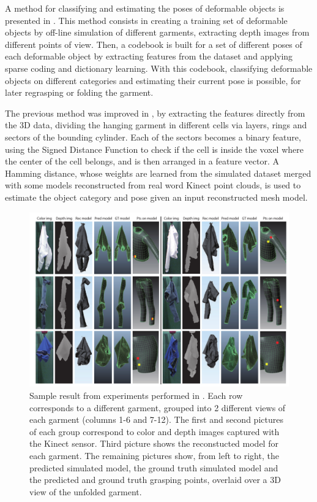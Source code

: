 A method for classifying and estimating the poses of deformable objects is presented in \cite{Li2014ICRA}. This method consists in creating a training set of deformable objects by off-line simulation of different garments, extracting depth images from different points of view. Then, a codebook is built for a set of different poses of each deformable object by extracting features from the dataset and applying sparse coding and dictionary learning. With this codebook, classifying deformable objects on different categories and estimating their current pose is possible, for later regrasping or folding the garment.

The previous method was improved in \cite{Li2014IROS}, by extracting the features directly from the 3D data, dividing the hanging garment in different cells via layers, rings and sectors of the bounding cylinder. Each of the sectors becomes a binary feature, using the Signed Distance Function to check if the cell is inside the voxel where the center of the cell belongs, and is then arranged in a feature vector. A Hamming distance, whose weights are learned from the simulated dataset merged with some models reconstructed from real word Kinect point clouds, is used to estimate the object category and pose given an input reconstructed mesh model.

\begin{figure}[thpb]
    \centering
    \includegraphics[width=\textwidth]{figures/SOTA_Li_2014-2.png}
    \caption[Sample result from experiments performed by Li et al.]{Sample result from experiments performed in \cite{Li2014IROS}. Each row corresponds to a different garment, grouped into 2 different views of each garment (columns 1-6 and 7-12). The first and second pictures of each group correspond to color and depth images captured with the Kinect sensor. Third picture shows the reconstucted model for each garment. The remaining pictures show, from left to right, the predicted simulated model, the ground truth simulated model and the predicted and ground truth grasping points, overlaid over a 3D view of the unfolded garment.
    }
    \label{fig:SOTA_Li_2014}
\end{figure}

